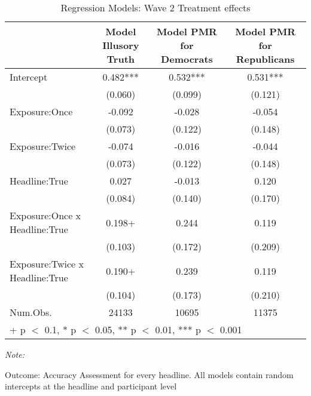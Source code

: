 \begin{table}

\caption{Regression Models: Wave 2 Treatment effects}
\centering
\begin{threeparttable}
\begin{tabular}[t]{lccc}
\toprule
  & Model Illusory Truth & Model PMR for Democrats & Model PMR for Republicans\\
\midrule
Intercept & 0.482*** & 0.532*** & 0.531***\\
 & (0.060) & (0.099) & (0.121)\\
Exposure:Once & -0.092 & -0.028 & -0.054\\
 & (0.073) & (0.122) & \vphantom{1} (0.148)\\
Exposure:Twice & -0.074 & -0.016 & -0.044\\
 & (0.073) & (0.122) & (0.148)\\
Headline:True & 0.027 & -0.013 & 0.120\\
 & (0.084) & (0.140) & (0.170)\\
Exposure:Once x Headline:True & 0.198+ & 0.244 & 0.119\\
 & (0.103) & (0.172) & (0.209)\\
Exposure:Twice x Headline:True & 0.190+ & 0.239 & 0.119\\
 & (0.104) & (0.173) & (0.210)\\
\midrule
Num.Obs. & 24133 & 10695 & 11375\\
\bottomrule
\multicolumn{4}{l}{\rule{0pt}{1em}+ p $<$ 0.1, * p $<$ 0.05, ** p $<$ 0.01, *** p $<$ 0.001}\\
\end{tabular}
\begin{tablenotes}
\item \textit{Note: } 
\item Outcome: Accuracy Assessment for every headline. All models contain random intercepts at the headline and participant level
\end{tablenotes}
\end{threeparttable}
\end{table}
